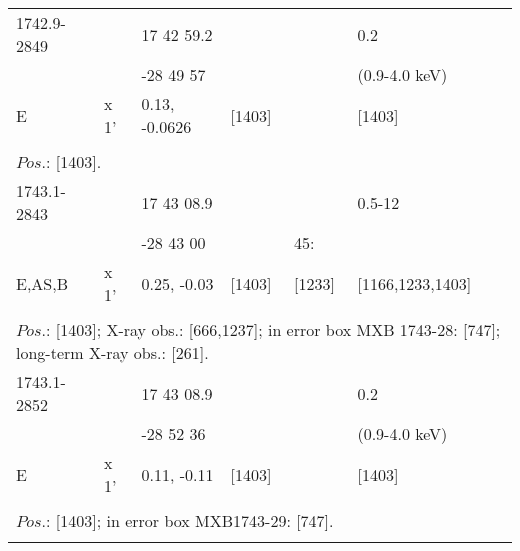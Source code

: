 \documentclass{aa}
\begin{document}
\begin{tabular}{p{2.5cm}p{1cm}p{1.8cm}p{2.3cm}p{3.3cm}p{2.0cm}p{2.2cm}}
\noalign{\smallskip}
1742.9-2849     &                 & 17 42 59.2               &                          &                      & 0.2                       &         \\
                            &                 & -28 49 57                 &                          &                      & (0.9-4.0 keV)     &         \\
     E                    & x 1'          & 0.13, -0.0626           & [1403]             &                      & [1403]                 &         \\
\\
\multicolumn{7}{p{17.5cm}}{
$Pos$.: [1403].}\\
\noalign{\smallskip}
\hline

\noalign{\smallskip}
1743.1-2843      &                   & 17 43 08.9            &                        &                         & 0.5-12                         &       \\
                            &                   & -28 43 00              &                         & 45:                  &                                     &       \\
E,AS,B               & x 1'            & 0.25, -0.03            & [1403]             & [1233]            & [1166,1233,1403]    &      \\
\\ 
\multicolumn{7}{p{17.5cm}}{
$Pos$.: [1403]; X-ray obs.: [666,1237]; in error box MXB 1743-28: [747]; long-term X-ray obs.: [261].}\\
\noalign{\smallskip}
\hline

\noalign{\smallskip}
1743.1-2852   &                    & 17 43 08.9            &                     &                         & 0.2                          &       \\
                          &                    & -28 52 36              &                     &                         &    (0.9-4.0 keV)     &      \\
E                       & x 1'             & 0.11, -0.11            & [1403]         &                        & [1403]                    &       \\
\\
\multicolumn{7}{p{17.5cm}}{
$Pos$.: [1403]; in error box MXB1743-29: [747].}\\
\noalign{\smallskip}
\hline


\end{tabular}
\end{document}
